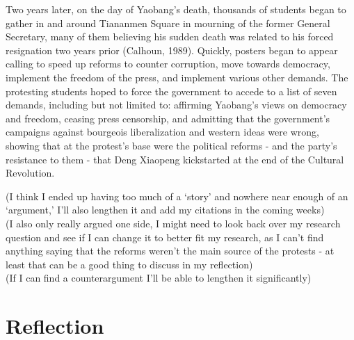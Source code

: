 \documentclass{paper}
\begin{document}
\begin{doublespace}
Two years later, on the day of Yaobang’s death, thousands of students began to gather in and around Tiananmen Square in mourning of the former General Secretary, many of them believing his sudden death was related to his forced resignation two years prior (Calhoun, 1989). Quickly, posters began to appear calling to speed up reforms to counter corruption, move towards democracy, implement the freedom of the press, and implement various other demands. The protesting students hoped to force the government to accede to a list of seven demands, including but not limited to: affirming Yaobang’s views on democracy and freedom, ceasing press censorship, and admitting that the government’s campaigns against bourgeois liberalization and western ideas were wrong, showing that at the protest’s base were the political reforms - and the party’s resistance to them - that Deng Xiaopeng kickstarted at the end of the Cultural Revolution.
\end{doublespace}

(I think I ended up having too much of a ‘story’ and nowhere near enough of an ‘argument,’ I’ll also lengthen it and add my citations in the coming weeks)\\
(I also only really argued one side, I might need to look back over my research question and see if I can change it to better fit my research, as I can’t find anything saying that the reforms weren’t the main source of the protests - at least that can be a good thing to discuss in my reflection)\\
(If I can find a counterargument I’ll be able to lengthen it significantly)\\
\newpage

\section{Reflection}
\begin{doublespace}
\end{doublespace}
\end{document}
